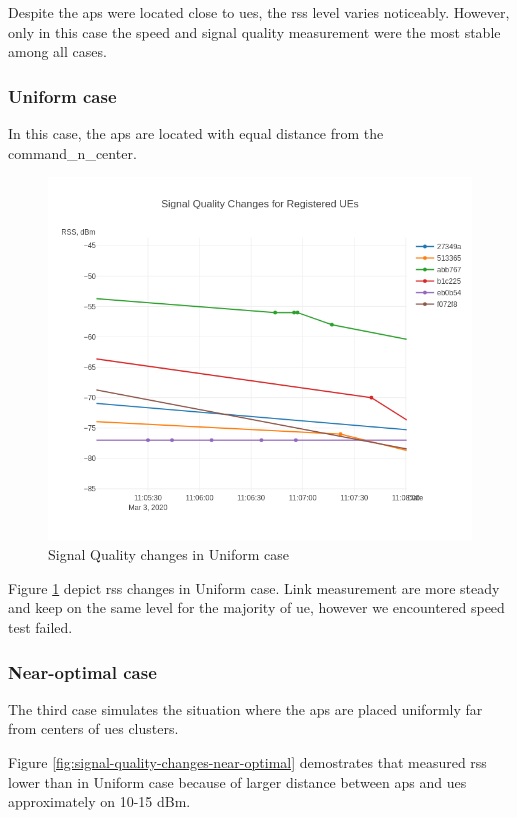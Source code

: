 Despite the \glspl{ap} were located close to \glspl{ue}, the \gls{rss} level varies noticeably. However, only in this case the speed and signal quality measurement were the most stable among all cases.

\subsubsection{Uniform case}

In this case, the \glspl{ap} are located with equal distance from the \gls{command_n_center}.

\begin{figure}[H]
	\centering
	\includegraphics[width=0.7\linewidth,keepaspectratio]{images/Exp4_Uniform.png}
\caption{Signal Quality changes in Uniform case}
\label{fig:signal-quality-changes-uniform-optimal}
\end{figure}

Figure \ref{fig:signal-quality-changes-uniform-optimal} depict \gls{rss} changes in Uniform case. Link measurement are more steady and keep on the same level for the majority of \gls{ue}, however we encountered speed test failed.

\subsubsection{Near-optimal case}

The third case simulates the situation where the \glspl{ap} are placed
uniformly far from centers of \glspl{ue} clusters.

Figure \ref{fig:signal-quality-changes-near-optimal} demostrates that measured \gls{rss} lower than in Uniform case because of larger distance between \glspl{ap} and \glspl{ue} approximately on 10-15 dBm.

